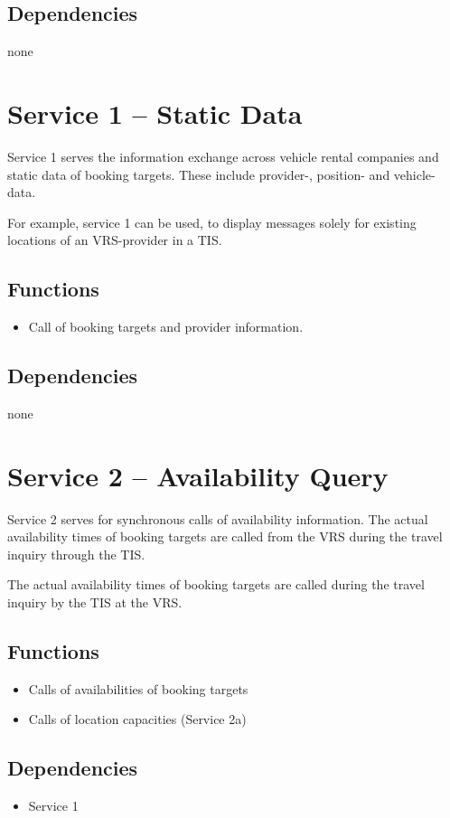 \subsection*{Dependencies}
none


\section{Service 1 -- Static Data}
\label{sec:Hierachiemodell:Dienst1}
Service 1 serves the information exchange across vehicle rental companies and static data of booking targets. These include provider-, position- and vehicle-data.

For example, service 1 can be used, to display messages solely for existing locations of an VRS-provider in a TIS. 
\subsection*{Functions}
\begin{itemize}
\item Call of booking targets and provider information.
\end{itemize}

\subsection*{Dependencies}
none

\section{Service 2 -- Availability Query}
\label{sec:Hierachiemodell:Dienst2}
Service 2 serves for synchronous calls of availability information. The actual availability times of booking targets are called from the VRS during the travel inquiry through the TIS.

The actual availability times of booking targets are called during the travel inquiry by the TIS at the VRS.
\subsection*{Functions}
\begin{itemize}
\item Calls of availabilities of booking targets
\item Calls of location capacities (Service 2a)
\end{itemize}

\subsection*{Dependencies}
\begin{itemize}
\item Service 1
\end{itemize}

